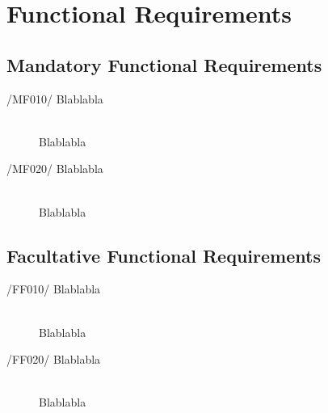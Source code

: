 \newpage
\section{Functional Requirements}

\subsection{Mandatory Functional Requirements}
\begin{description}
\item[/MF010/ Blablabla]\hfill \\ Blablabla
\item[/MF020/ Blablabla]\hfill \\ Blablabla
\end{description}

\subsection{Facultative Functional Requirements}
\begin{description}
\item[/FF010/ Blablabla]\hfill \\ Blablabla
\item[/FF020/ Blablabla]\hfill \\ Blablabla
\end{description}